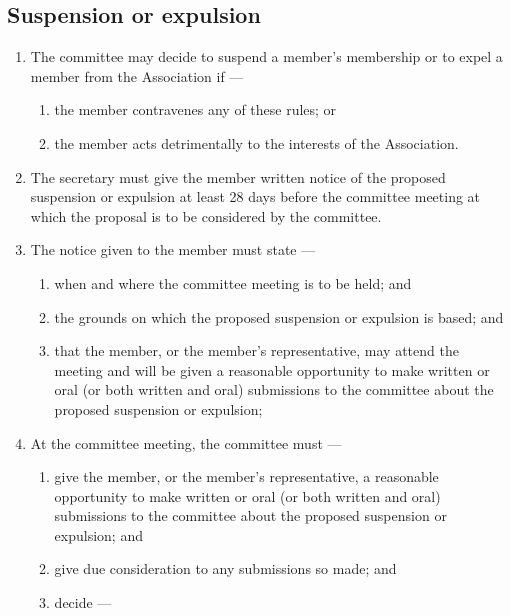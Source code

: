 \documentclass[../constitution.tex]{subfiles}
\begin{document}
\hypertarget{suspension-or-expulsion}{%
\subsection{Suspension or expulsion}\label{suspension-or-expulsion}}

\begin{enumerate}

\item The committee may decide to suspend a member's membership or to expel a member from the Association if ---

  \begin{enumerate}
  
  \item the member contravenes any of these rules; or
  \item the member acts detrimentally to the interests of the Association.
  \end{enumerate}
\item The secretary must give the member written notice of the proposed suspension or expulsion at least 28 days before the committee meeting at which the proposal is to be considered by the committee.
\item The notice given to the member must state ---

  \begin{enumerate}
  
  \item when and where the committee meeting is to be held; and
  \item the grounds on which the proposed suspension or expulsion is based; and
  \item that the member, or the member's representative, may attend the meeting and will be given a reasonable opportunity to make written or oral (or both written and oral) submissions to the committee about the proposed suspension or expulsion;
  \end{enumerate}
\item At the committee meeting, the committee must ---

  \begin{enumerate}
  
  \item give the member, or the member's representative, a reasonable opportunity to make written or oral (or both written and oral) submissions to the committee about the proposed suspension or expulsion; and
  \item give due consideration to any submissions so made; and
  \item decide ---


\end{enumerate}
\end{enumerate}
\end{document}

